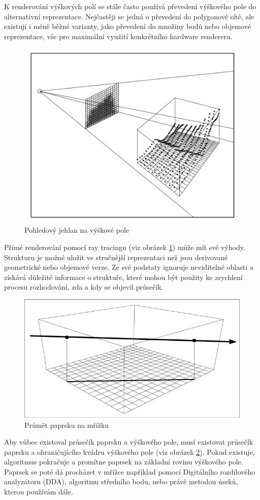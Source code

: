 \documentclass[report,11pt]{elsarticle}
\begin{document}
K renderování výškových polí se stále často používá převedení výškového pole do alternativní reprezentace. Nejčastěji se jedná o převedení do polygonové sítě, ale existují i méně běžné varianty, jako převedení do množiny bodů nebo objemové reprezentace, vše pro maximální využití konkrétního hardware rendereru.


\begin{figure}[h]
\hfill\includegraphics[width=0.6\linewidth]{rtfrustum.png}\hspace*{\fill}
\caption{Pohledový jehlan na výškové pole}
\label{fig:raytracing}
\end{figure}



Přímé renderování pomocí ray tracingu (viz obrázek \ref{fig:raytracing}) může mít své výhody. Strukturu je možné uložit ve stručnější reprezentaci než jsou derivované geometrické nebo objemové verze. Ze své podstaty ignoruje neviditelné oblasti a získává důležité informace o struktuře, které mohou být použity ke zrychlení procesu rozhodování, zda a kdy se objevil průsečík.


\begin{figure}[h]
\hfill\includegraphics[width=0.6\linewidth]{Projection-of-the-ray-onto-the-height-field-base-plane.png}\hspace*{\fill}
\caption{Průmět paprsku na mřížku}
\label{fig:prumet}
\end{figure}


Aby vůbec existoval průsečík paprsku a výškového pole, musí existovat průsečík paprsku a ohraničujícího kvádru výškového pole (viz obrázek \ref{fig:prumet}). Pokud existuje, algoritmus pokračuje a promítne paprsek na základní rovinu výškového pole. Paprsek se poté dá procházet v mřížce například pomocí Digitálního rozdílového analyzátoru (DDA), algoritmu středního bodu, nebo právě metodou úseků, kterou používám dále.
\end{document}
